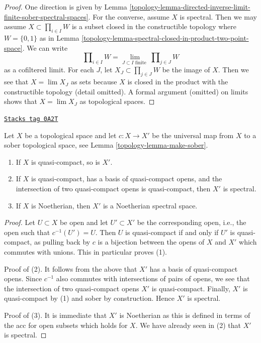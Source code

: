 \begin{proof}

One direction is given by
Lemma \ref{topology-lemma-directed-inverse-limit-finite-sober-spectral-spaces}.
For the converse, assume $X$ is spectral. Then we
may assume $X \subset \prod_{i \in I} W$ is a subset closed
in the constructible topology where $W = \{0, 1\}$ as in
Lemma \ref{topology-lemma-spectral-closed-in-product-two-point-space}.
We can write
$$
\prod\nolimits_{i \in I} W =
\lim_{J \subset I\text{ finite }} \prod\nolimits_{j \in J} W
$$
as a cofiltered limit.
For each $J$, let $X_J \subset \prod_{j \in J} W$ be the image of $X$.
Then we see that $X = \lim X_J$ as sets because $X$ is closed in
the product with the constructible topology (detail omitted).
A formal argument (omitted) on limits shows that $X = \lim X_J$ as topological
spaces.
\end{proof}

\begin{lemma}
\label{topology-lemma-Noetherian-goes-to-spectral}
\href{https://stacks.math.columbia.edu/tag/0A2T}{\texttt{Stacks tag 0A2T}}

Let $X$ be a topological space and let $c : X \to X'$ be the universal
map from $X$ to a sober topological space, see
Lemma \ref{topology-lemma-make-sober}.
\begin{enumerate}
\item If $X$ is quasi-compact, so is $X'$.
\item If $X$ is quasi-compact, has a basis of quasi-compact opens,
and the intersection of two quasi-compact opens is quasi-compact, then
$X'$ is spectral.
\item If $X$ is Noetherian, then $X'$ is a Noetherian spectral space.
\end{enumerate}
\end{lemma}

\begin{proof}
Let $U \subset X$ be open and let $U' \subset X'$ be the corresponding
open, i.e., the open such that $c^{-1}(U') = U$.
Then $U$ is quasi-compact if and only if $U'$ is quasi-compact,
as pulling back by $c$ is a bijection between the opens of
$X$ and $X'$ which commutes with unions. This in particular proves (1).

\medskip\noindent
Proof of (2). It follows from the above that $X'$ has a basis of
quasi-compact opens. Since $c^{-1}$ also
commutes with intersections of pairs of opens, we see that
the intersection of two quasi-compact opens $X'$ is quasi-compact.
Finally, $X'$ is quasi-compact by (1) and sober by construction.
Hence $X'$ is spectral.

\medskip\noindent
Proof of (3). It is immediate that $X'$ is Noetherian as this is defined
in terms of the acc for open subsets which holds for $X$. We have
already seen in (2) that $X'$ is spectral.
\end{proof}

